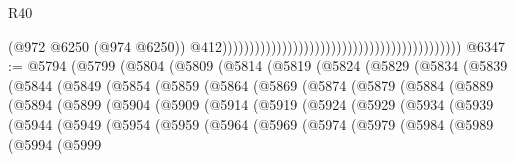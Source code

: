 \begin{lexlean}{R40}
\begin{coremodule}
                                                                                            (@972
                                                                                              @6250
                                                                                              (@974
                                                                                                @6250))
                                                                                            @412))))))))))))))))))))))))))))))))))))))))))))
@6347 := @5794
    (@5799
      (@5804
        (@5809
          (@5814
            (@5819
              (@5824
                (@5829
                  (@5834
                    (@5839
                      (@5844
                        (@5849
                          (@5854
                            (@5859
                              (@5864
                                (@5869
                                  (@5874
                                    (@5879
                                      (@5884
                                        (@5889
                                          (@5894
                                            (@5899
                                              (@5904
                                                (@5909
                                                  (@5914
                                                    (@5919
                                                      (@5924
                                                        (@5929
                                                          (@5934
                                                            (@5939
                                                              (@5944
                                                                (@5949
                                                                  (@5954
                                                                    (@5959
                                                                      (@5964
                                                                        (@5969
                                                                          (@5974
                                                                            (@5979
                                                                              (@5984
                                                                                (@5989
                                                                                  (@5994
                                                                                    (@5999

\end{coremodule}
\end{lexlean}
